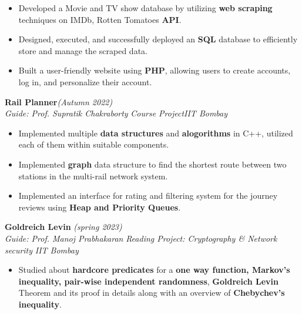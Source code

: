 \documentclass[10 pt]{article}
\begin{document}
		\begin{itemize}[itemsep = -0.8 mm, leftmargin=*]
		\vspace{-16pt}
		\item Developed a Movie and TV show database by utilizing \textbf{web scraping} techniques on IMDb, Rotten Tomatoes \textbf{API}.
		\item Designed, executed, and successfully deployed an \textbf{SQL} database to efficiently store and manage the scraped data.
		\item Built a user-friendly website using \textbf{PHP}, allowing users to create accounts, log in, and personalize their account.
	\end{itemize}
{\selectfont
		\textbf{{Rail Planner}}\hfill{\sl \small (Autumn 2022)}\\
	}{\it Guide: Prof. Supratik Chakraborty \textbar} {\it Course Project}\hfill{\sl \small IIT Bombay}\\
	\begin{itemize}[itemsep = -0.8 mm, leftmargin=*]
		\vspace{-16pt}
		\item Implemented multiple \textbf{data structures} and \textbf{alogorithms} in C++, utilized each of them within suitable components.
\item Implemented {\bf graph} data structure to find the shortest route between two stations in the multi-rail network system.
\item Implemented an interface for rating and filtering system for the journey reviews using \textbf{Heap and Priority Queues}.
	\end{itemize}
  	{\selectfont
		\textbf{{Goldreich Levin }}\hfill{\sl \small (spring 2023)}\\
	}{\it Guide: Prof. Manoj Prabhakaran \textbar} {\it Reading Project:  Cryptography \& Network security }\hfill{\sl \small IIT Bombay}\\
	\begin{itemize}[itemsep = -0.8 mm, leftmargin=*]
		\vspace{-16pt}
		\item  Studied about \textbf{hardcore predicates} for a \textbf{one way function, Markov’s inequality, pair-wise
independent randomness}, \textbf{Goldreich Levin} Theorem and its
proof in details along with an overview of \textbf{Chebychev’s inequality}.
	\end{itemize}
 \vspace{-16pt}
\end{document}

